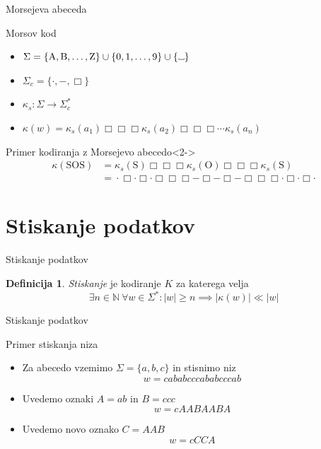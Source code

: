 \documentclass{beamer}
\newcommand{\N}{\mathbb{N}}
\theoremstyle{definition} %
\newtheorem{definicija}{Definicija}[section]
\newcommand\Vtextvisiblespace[1][.3em]{%
\mbox{\kern.06em\vrule height.3ex}%
\vbox{\hrule width#1}%
\hbox{\vrule height.3ex}}
\begin{document}
\begin{frame}{Morsejeva abeceda}
    \begin{block}{Morsov kod}
        \begin{itemize}
            \item  $ \Sigma = \{ \text{A},  \text{B}, \ldots, \text{Z} \} \cup \{ 0, 1, \ldots, 9 \}
            \cup \{ \Vtextvisiblespace[5pt] \} $
            \item $ \Sigma_c = \{ \cdot ,-, \Box \} $
            \item $ \kappa_s \colon \Sigma \to \Sigma_c^* $
            \item $ \kappa(w) = \kappa_s(a_1) \Box\Box\Box  \kappa_s(a_2) \Box\Box\Box \cdots \kappa_s(a_n) $
        \end{itemize}
    \end{block}
    \begin{exampleblock}{Primer kodiranja z Morsejevo abecedo}<2->
        \[
        \begin{split}
            \kappa(\text{SOS}) & = \kappa_s(\text{S}) \Box\Box\Box \kappa_s(\text{O}) \Box\Box\Box \kappa_s(\text{S})\\
            & = \phantom{} \cdot\Box\cdot\Box\cdot \Box\Box\Box -\Box-\Box- \Box\Box\Box \cdot\Box\cdot\Box\cdot \phantom{}  
        \end{split}
        \]
    \end{exampleblock}
\end{frame}

\section*{Stiskanje podatkov}

\begin{frame}{Stiskanje podatkov}    
    \begin{definicija}
        \textit{Stiskanje} je kodiranje $ K $ za katerega velja 
        \[ 
        \exists n \in \N \ \forall w \in \Sigma^* \colon |w| \geq n \implies
        \left\lvert \kappa(w)\right\rvert \ll \left\lvert w \right\rvert
        \]
    \end{definicija}
\end{frame}

\begin{frame}{Stiskanje podatkov}
    \begin{exampleblock}{Primer stiskanja niza}
        \begin{itemize}
            \item Za abecedo vzemimo $ \Sigma = \{ a,b,c \} $ in stisnimo niz
            \[
                w = \mathit{cababcccababcccab}
            \]
            \item<2-> Uvedemo oznaki $ A = \mathit{ab} $ in $ B = \mathit{ccc} $ 
            \[
                w = \mathit{cAABAABA}
            \]
            \item<3-> Uvedemo novo oznako $ C = \mathit{AAB} $
            \[
                w = \mathit{cCCA}
            \]    
        \end{itemize}
    \end{exampleblock}
\end{frame}
\end{document}
